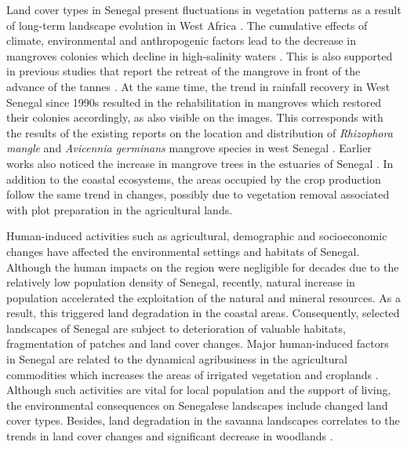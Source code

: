 \documentclass[earth,article,submit,pdftex,moreauthors]{Definitions/mdpi}
\begin{document}
{{Land} cover types in Senegal {present } fluctuations in vegetation patterns as a result of long-term landscape evolution in West Africa \cite{Furian,033139ar,LOUM2014100,BRINK2009501}. {The} cumulative effects of {climate}, environmental and anthropogenic factors {lead to the decrease in} mangroves colonies which decline in high-salinity waters \cite{dieye2013dynamique}. This is also supported in {previous studies that} report the retreat of the mangrove in front of the advance of the tannes \cite{Lebigre}. At the same time, the{ }trend in rainfall recovery in West Senegal since 1990s \cite{andrieu2020botanical} resulted in the rehabilitation in mangroves which restored their colonies accordingly, {as also }visible on the images. This corresponds with the results of the {existing reports} on the location and distribution of \emph{Rhizophora mangle} and \emph{Avicennia germinans} mangrove species in west Senegal \cite{Diaw,rs13101961}. Earlier {works} also {noticed} the increase in mangrove trees in the estuaries of Senegal{ }\cite{FENT2019214}. {In addition to {the }coastal ecosystems, the areas occupied by {the }crop production follow the same trend in changes, possibly due to vegetation removal associated with plot preparation in the agricultural lands.}

{Human-induced activities such as agricultural, demographic and socioeconomic changes have affected {the} environmental settings {and habitats }of Senegal. Although the {human impacts} on the region were negligible for decades{ }due to the relatively low population density of Senegal, recently, natural increase in population{ }accelerated {the }exploitation of the natural and mineral resources{. }As a result, this triggered {land} degradation in {the} coastal areas. Consequently, selected landscapes of Senegal are subject to deterioration of valuable habitats, fragmentation of patches and land cover changes.} Major human-induced {factors in Senegal are related to} the dynamical agribusiness in the agricultural commodities which {increases the }  areas of irrigated vegetation {and croplands} \cite{land8030042}. {Although such }activities are vital for local population and the support of living{, }the environmental consequences on Senegalese landscapes include{ }changed land cover types. Besides, land degradation{ }in the savanna landscapes { }correlates to the trends in land{ }cover changes and significant decrease in woodlands \cite{Kalema}.

}
\end{document}
